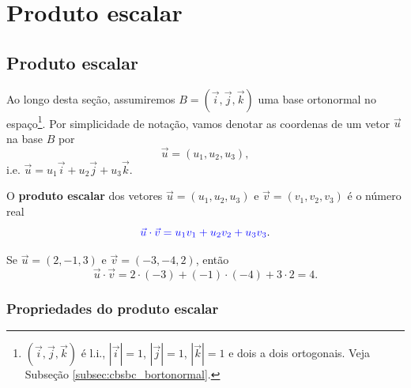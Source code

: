 
\chapter{Produto escalar}\label{cap_prodesc}
\thispagestyle{fancy}

\section{Produto escalar}\label{cap_prodesc_sec_prodesc}

Ao longo desta seção, assumiremos $B = (\vec{i},\vec{j},\vec{k})$ uma base ortonormal no espaço\footnote{$(\vec{i},\vec{j},\vec{k})$ é l.i., $|\vec{i}|=1$, $|\vec{j}|=1$, $|\vec{k}|=1$ e dois a dois ortogonais. Veja Subseção \ref{subsec:cbsbc_bortonormal}.}. Por simplicidade de notação, vamos denotar as coordenas de um vetor $\vec{u}$ na base $B$ por
\begin{equation}
  \vec{u} = (u_1, u_2, u_3),
\end{equation}
i.e. $\vec{u} = u_1\vec{i} + u_2\vec{j} + u_3\vec{k}$.

O {\color{blue}\bf produto escalar} dos vetores $\vec{u} = (u_1,u_2,u_3)$ e $\vec{v}=(v_1,v_2,v_3)$ é o número real
\begin{equation}\label{eq:prodesc_ortonormal}
  {\color{blue}\vec{u}\cdot\vec{v} = u_1v_1+u_2v_2+u_3v_3}.
\end{equation}

\begin{ex}
  Se $\vec{u}=(2,-1,3)$ e $\vec{v}=(-3,-4,2)$, então
  \begin{equation}
    \vec{u}\cdot\vec{v} = 2\cdot(-3)+(-1)\cdot(-4)+3\cdot 2 = 4.
  \end{equation}
\end{ex}

\subsection{Propriedades do produto escalar}

